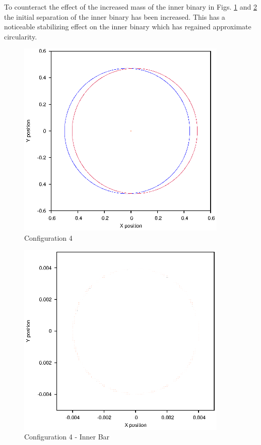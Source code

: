 \documentclass[a4paper,12pt]{article}
\begin{document}
To counteract the effect of the increased mass of the inner binary in Figs. \ref{fig:config4} and \ref{fig:config4i} the initial separation of the 
inner binary has been increased. This has a noticeable stabilizing effect on the inner binary which has regained approximate circularity.
\begin{figure}[H]
\centering
\includegraphics[width=0.9\textwidth]{./2016results/004-5-004/Orbit.eps}
\caption{Configuration 4}
\label{fig:config4}
\end{figure}
\begin{figure}[H]
\centering
\includegraphics[width=0.9\textwidth]{./2016results/004-5-004/Inner.eps}
\caption{Configuration 4 - Inner Bar}
\label{fig:config4i}
\end{figure}
\end{document}
